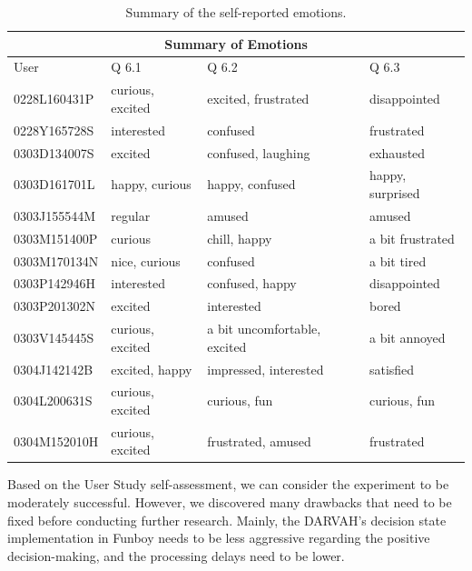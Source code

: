 \begin{table}[]
\centering
    \begin{tabular}{|l|l|l|l|}
    \hline
    \multicolumn{4}{|c|}{Summary of Emotions} \\ \hline
    User           & Q 6.1  & Q 6.2  & Q 6.3  \\ \hline
    0228L160431P   & curious, excited & excited, frustrated & disappointed \\ \hline
    0228Y165728S   & interested & confused & frustrated \\ \hline
    0303D134007S   & excited & confused, laughing & exhausted \\ \hline
    0303D161701L   & happy, curious & happy, confused & happy, surprised\\ \hline
    0303J155544M   & regular & amused & amused \\ \hline
    0303M151400P   & curious & chill, happy & a bit frustrated \\ \hline
    0303M170134N   & nice, curious & confused & a bit tired \\ \hline
    0303P142946H   & interested & confused, happy & disappointed \\ \hline
    0303P201302N   & excited & interested & bored \\ \hline
    0303V145445S   & curious, excited & a bit uncomfortable, excited & a bit annoyed\\ \hline
    0304J142142B   & excited, happy & impressed, interested & satisfied \\ \hline
    0304L200631S   & curious, excited & curious, fun & curious, fun \\ \hline
    0304M152010H   & curious, excited & frustrated, amused & frustrated \\ \hline
    \end{tabular}
\caption{Summary of the self-reported emotions.}
\label{table:us5}
\end{table}

Based on the User Study self-assessment, we can consider the experiment to be moderately successful. However, we discovered many drawbacks that need to be fixed before conducting further research. Mainly, the DARVAH's decision state implementation in Funboy needs to be less aggressive regarding the positive decision-making, and the processing delays need to be lower.